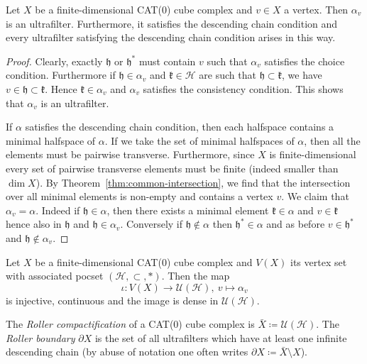 \begin{lemma}
  \label{lem:principle-uf}
  Let \(X\) be a finite-dimensional CAT(0) cube complex and \(v \in X\) a vertex. Then \(\alpha_v\) is an ultrafilter. Furthermore, it satisfies the descending chain condition and every ultrafilter satisfying the descending chain condition arises in this way.
\end{lemma}

\begin{proof}
  Clearly, exactly \(\mathfrak{h}\) or \(\mathfrak{h}^\ast\) must contain \(v\) such that \(\alpha_v\) satisfies the choice condition. Furthermore if \(\mathfrak{h} \in \alpha_v\) and \(\mathfrak{k} \in \mathcal{H}\) are such that \(\mathfrak{h} \subset \mathfrak{k}\), we have \(v \in \mathfrak{h} \subset \mathfrak{k}\). Hence \(\mathfrak{k} \in \alpha_v\) and \(\alpha_v\) satisfies the consistency condition. This shows that \(\alpha_v\) is an ultrafilter.

    If \(\alpha\) satisfies the descending chain condition, then each halfspace contains a minimal halfspace of \(\alpha\). If we take the set of minimal halfspaces of \(\alpha\), then all the elements must be pairwise transverse. Furthermore, since \(X\) is finite-dimensional every set of pairwise transverse elements must be finite (indeed smaller than \(\dim X\)). By Theorem~\ref{thm:common-intersection}, we find that the intersection over all minimal elements is non-empty and contains a vertex \(v\). We claim that \(\alpha_v = \alpha\). Indeed if \(\mathfrak{h} \in \alpha\), then there exists a minimal element \(\mathfrak{k} \in \alpha\) and \(v \in \mathfrak{k}\) hence also in \(\mathfrak{h}\) and \(\mathfrak{h} \in \alpha_v\). Conversely if \(\mathfrak{h} \not \in \alpha\) then \(\mathfrak{h}^\ast \in \alpha\) and as before \(v \in \mathfrak{h}^\ast\) and \(\mathfrak{h} \not \in \alpha_v\).
\end{proof}

\begin{thm}
  \label{thm:roller-compactification}
  Let \(X\) be a finite-dimensional CAT(0) cube complex and \(V(X)\) its vertex set with associated pocset \((\mathcal{H}, \subset, \ast)\). Then the map
  \[
    \iota\colon V(X) \to \mathcal{U}(\mathcal{H}),\ v \mapsto \alpha_v
  \]
  is injective, continuous and the image is dense in \(\mathcal{U}(\mathcal{H})\). 
\end{thm}

\begin{defin}
  The \emph{Roller compactification} of a CAT(0) cube complex is \(\bar X \coloneqq \mathcal{U}(\mathcal{H})\). The \emph{Roller boundary} \(\partial X\) is the set of all ultrafilters which have at least one infinite descending chain (by abuse of notation one often writes \(\partial X \coloneqq \bar X \setminus X\)).
\end{defin}

